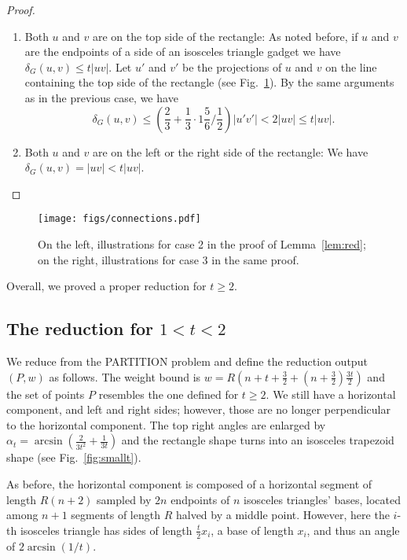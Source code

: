 \documentclass[a4paper]{llncs}
\begin{document}
\begin{proof}
\begin{enumerate}
\item Both $u$ and $v$ are on the top side of the rectangle:
As noted before, if $u$ and $v$ are the endpoints of a side of 
an isosceles triangle gadget we have $\delta_G(u,v) \leq t|uv|$.
Let $u'$ and $v'$ be the projections of $u$ and $v$ on the line 
containing the top side of the rectangle (see Fig.~\ref{fig:connections}).
By the same arguments as in the previous case, 
we have 
$$\delta_G(u,v) \leq (\frac{2}{3}+\frac{1}{3} \cdot 1\frac{5}{6}/\frac{1}{2})|u'v'|< 2|uv| \leq t|uv|.$$

\item Both $u$ and $v$ are on the left or the right side of the rectangle:
We have $\delta_G(u,v)=|uv| < t|uv|$.
\end{enumerate}

\end{proof}
\begin{figure}[htb]
    \centering
        \texttt{[image: figs/connections.pdf]}
    \caption{On the left, illustrations for case 2 in the proof of Lemma~\ref{lem:red};
    on the right, illustrations for case 3 in the same proof. }
    \label{fig:connections}
\end{figure}
Overall, we proved a proper reduction for $t \geq 2$.



\subsection{The reduction for $1<t<2$}\label{subsec:1<t<2}

We reduce from the PARTITION problem
and define the reduction output $(P,w)$ as follows.
The weight bound is $w=R(n+t+\frac{3}{2}+(n+\frac{3}{2})\frac{3t}{2})$ and the set of points $P$
resembles the one defined for $t\geq 2$. 
We still have a horizontal component, and left and right sides;
however, those are no longer perpendicular to the horizontal component.
The top right angles are enlarged by $\alpha_t=\arcsin(\frac{2}{3t^2}+\frac{1}{3t})$ 
and the rectangle shape turns into an isosceles trapezoid shape (see Fig.~\ref{fig:smallt}).

As before, the horizontal component is composed of a horizontal segment of length $R(n+2)$ 
sampled by $2n$ endpoints of $n$ isosceles triangles' bases, 
located among $n+1$ segments of length $R$
halved by a middle point. 
However, here the $i$-th isosceles triangle has sides of length $\frac{t}{2}x_i$, 
a base of length $x_i$, and thus an angle of $2\arcsin(1/t)$.
\end{document}
